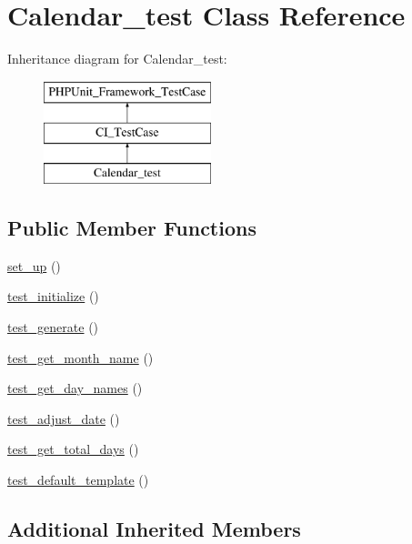 \hypertarget{class_calendar__test}{}\section{Calendar\+\_\+test Class Reference}
\label{class_calendar__test}
Inheritance diagram for Calendar\+\_\+test\+:\begin{figure}[H]
\begin{center}
\leavevmode
\includegraphics[height=3.000000cm]{class_calendar__test}
\end{center}
\end{figure}
\subsection*{Public Member Functions}
\begin{DoxyCompactItemize}
\item 
\hyperlink{class_calendar__test_a69829875c8d4b6ce94908445c4155741}{set\+\_\+up} ()
\item 
\hyperlink{class_calendar__test_abaff3af863ef017b0a78529dbf91e450}{test\+\_\+initialize} ()
\item 
\hyperlink{class_calendar__test_ace0c2e39632dd4ab90d87a608c1ec5d6}{test\+\_\+generate} ()
\item 
\hyperlink{class_calendar__test_a626878f5f357fbd8f34ce2f8a9142cbe}{test\+\_\+get\+\_\+month\+\_\+name} ()
\item 
\hyperlink{class_calendar__test_a41769afeabac2333b6ee1c2d2841d2af}{test\+\_\+get\+\_\+day\+\_\+names} ()
\item 
\hyperlink{class_calendar__test_a18048ef18b98340c3a7c43664b7849d7}{test\+\_\+adjust\+\_\+date} ()
\item 
\hyperlink{class_calendar__test_a6e6994310607fdc1780926ceb45405d5}{test\+\_\+get\+\_\+total\+\_\+days} ()
\item 
\hyperlink{class_calendar__test_ac978e07a480f7770fa32393191ccca10}{test\+\_\+default\+\_\+template} ()
\end{DoxyCompactItemize}
\subsection*{Additional Inherited Members}


